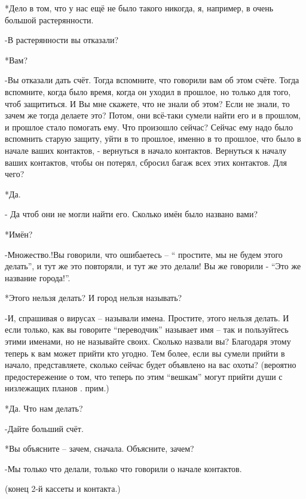 *Дело в том, что у нас ещё не было такого никогда, я, например, в очень большой растерянности.

-В растерянности вы отказали?

*Вам?

-Вы отказали дать счёт. Тогда вспомните, что говорили вам об этом счёте. Тогда вспомните, когда было время, когда он уходил в прошлое, но только для того, чтоб защититься. И Вы мне скажете, что не знали об этом? Если не знали, то зачем же тогда  делаете это? Потом, они всё-таки сумели найти его и в прошлом, и прошлое стало помогать ему. Что произошло сейчас? Сейчас ему надо было вспомнить старую защиту, уйти в то прошлое, именно в то прошлое, что было в начале ваших контактов, - вернуться в начало контактов. Вернуться к началу ваших контактов, чтобы он потерял, сбросил багаж всех этих контактов. Для чего?

*Да.

- Да чтоб они не могли найти его. Сколько имён было названо вами?

*Имён?

-Множество.!Вы говорили, что ошибаетесь – “ простите, мы не будем этого делать”, и тут же это повторяли, и тут же это делали! Вы же говорили - “Это же название города!”.

*Этого нельзя делать? И город нельзя называть?

-И, спрашивая о вирусах – называли имена. Простите, этого нельзя делать. И если только, как вы говорите “переводчик” называет имя – так и пользуйтесь этими именами, но не называйте своих. Сколько назвали вы? Благодаря этому теперь к вам может прийти кто угодно. Тем более, если вы сумели прийти в начало, представляете, сколько сейчас будет объявлено на вас охоты? (вероятно предостережение о том, что теперь по этим “вешкам” могут прийти души с низлежащих планов . прим.)

*Да. Что нам делать?

-Дайте больший счёт.

*Вы объясните – зачем, сначала. Объясните, зачем?

-Мы только что делали, только что говорили о  начале контактов.

(конец 2-й кассеты и контакта.)